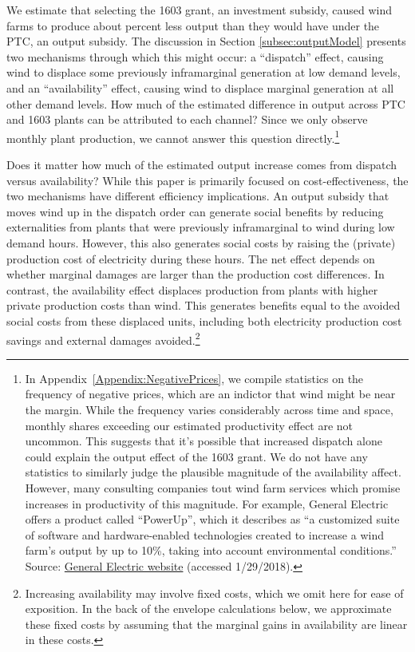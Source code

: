 \documentclass[12pt]{article}
\begin{document}
We estimate that selecting the 1603 grant, an investment subsidy, caused wind farms to produce about percent less output than they would have under the PTC, an output subsidy. The discussion in Section \ref{subsec:outputModel} presents two mechanisms through which this might occur: a ``dispatch'' effect, causing wind to displace some previously inframarginal generation at low demand levels, and an ``availability'' effect, causing wind to displace marginal generation at all other demand levels. How much of the estimated difference in output across PTC and 1603 plants can be attributed to each channel? Since we only observe monthly plant production, we cannot answer this question directly.\footnote{In Appendix~\ref{Appendix:NegativePrices}, we compile statistics on the frequency of negative prices, which are an indictor that wind might be near the margin. While the frequency varies considerably across time and space, monthly shares exceeding our estimated productivity effect are not uncommon. This suggests that it's possible that increased dispatch alone could explain the output effect of the 1603 grant. We do not have any statistics to similarly judge the plausible magnitude of the availability affect. However, many consulting companies tout wind farm services which promise increases in productivity of this magnitude. For example, General Electric offers a product called ``PowerUp'', which it describes as ``a customized suite of software and hardware-enabled technologies created to increase a wind farm's output by up to 10\%, taking into account environmental conditions.'' Source: \href{https://www.gerenewableenergy.com/wind-energy/turbine-services/platform-upgrades}{General Electric website} (accessed 1/29/2018).}

Does it matter how much of the estimated output increase comes from dispatch versus availability? While this paper is primarily focused on cost-effectiveness, the two mechanisms have different efficiency implications. An output subsidy that moves wind up in the dispatch order can generate social benefits by reducing externalities from plants that were previously inframarginal to wind during low demand hours. However, this also generates social costs by raising the (private) production cost of electricity during these hours. The net effect depends on whether marginal damages are larger than the production cost differences. In contrast, the availability effect displaces production from plants with higher private production costs than wind. This generates benefits equal to the avoided social costs from these displaced units, including both electricity production cost savings and external damages avoided.\footnote{Increasing availability may involve fixed costs, which we omit here for ease of exposition. In the back of the envelope calculations below, we approximate these fixed costs by assuming that the marginal gains in availability are linear in these costs.}
\end{document}
